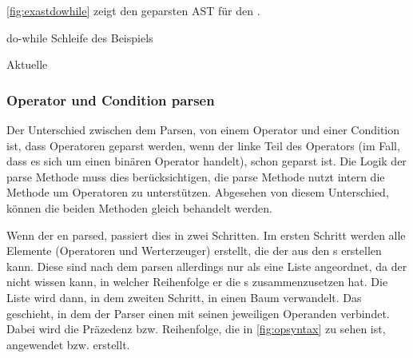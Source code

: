 {{{      \autoref{fig:exastdowhile} zeigt den geparsten AST für den .
      \begin{paracol}{2}
        \begin{myCodeEnv}
          \centering
          \begin{myInvBox}[width=.9\linewidth]
            
          \end{myInvBox}
          \caption{do-while Schleife des Beispiels}
          \label{fig:exastdowhile}
        \end{myCodeEnv}
        \switchcolumn
        \begin{myCodeEnv}
          \centering
          \begin{myInvBox}[width=.9\linewidth]
            
          \end{myInvBox}
          \caption*{Aktuelle }
        \end{myCodeEnv}
      \end{paracol}


    \subsubsection{Operator und Condition parsen}
    \label{sssec:Operator und Condition parsen}
      Der Unterschied zwischen dem Parsen, von einem Operator und einer Condition ist, dass Operatoren geparst werden, wenn der linke Teil des Operators (im Fall, dass es sich um einen binären Operator handelt), schon geparst ist. Die Logik der  parse Methode muss dies berücksichtigen, die  parse Methode nutzt intern die  Methode um Operatoren zu unterstützen. Abgesehen von diesem Unterschied, können die beiden Methoden gleich behandelt werden.

      Wenn der  en parsed, passiert dies in zwei Schritten. Im ersten Schritt werden alle  Elemente (Operatoren und Werterzeuger) erstellt, die der  aus den s erstellen kann. Diese sind nach dem parsen allerdings nur als eine Liste angeordnet, da der  nicht wissen kann, in welcher Reihenfolge er die s zusammenzusetzen hat. Die Liste wird dann, in dem zweiten Schritt, in einen Baum verwandelt. Das geschieht, in dem der Parser einen  mit seinen jeweiligen Operanden verbindet. Dabei wird die Präzedenz bzw. Reihenfolge, die in \autoref{fig:opsyntax} zu sehen ist, angewendet bzw. erstellt.

}}}
